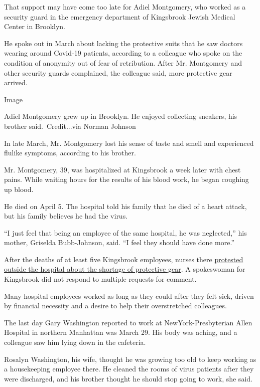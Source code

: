 That support may have come too late for Adiel Montgomery, who worked as
a security guard in the emergency department of Kingsbrook Jewish
Medical Center in Brooklyn.

He spoke out in March about lacking the protective suits that he saw
doctors wearing around Covid-19 patients, according to a colleague who
spoke on the condition of anonymity out of fear of retribution. After
Mr. Montgomery and other security guards complained, the colleague said,
more protective gear arrived.

Image

Adiel Montgomery grew up in Brooklyn. He enjoyed collecting sneakers,
his brother said.~Credit...via Norman Johnson

In late March, Mr. Montgomery lost his sense of taste and smell and
experienced flulike symptoms, according to his brother.

Mr. Montgomery, 39, was hospitalized at Kingsbrook a week later with
chest pains. While waiting hours for the results of his blood work, he
began coughing up blood.

He died on April 5. The hospital told his family that he died of a heart
attack, but his family believes he had the virus.

``I just feel that being an employee of the same hospital, he was
neglected,'' his mother, Griselda Bubb-Johnson, said. ``I feel they
should have done more.''

After the deaths of at least five Kingsbrook employees, nurses there
\href{https://gothamist.com/news/we-will-all-die-kingsbrook-hospital-nurses-demand-protective-gear-after-their-colleagues-succumb-covid-19}{protested
outside the hospital about the shortage of protective gear}. A
spokeswoman for Kingsbrook did not respond to multiple requests for
comment.

Many hospital employees worked as long as they could after they felt
sick, driven by financial necessity and a desire to help their
overstretched colleagues.

The last day Gary Washington reported to work at NewYork-Presbyterian
Allen Hospital in northern Manhattan was March 29. His body was aching,
and a colleague saw him lying down in the cafeteria.

Rosalyn Washington, his wife, thought he was growing too old to keep
working as a housekeeping employee there. He cleaned the rooms of virus
patients after they were discharged, and his brother thought he should
stop going to work, she said.


